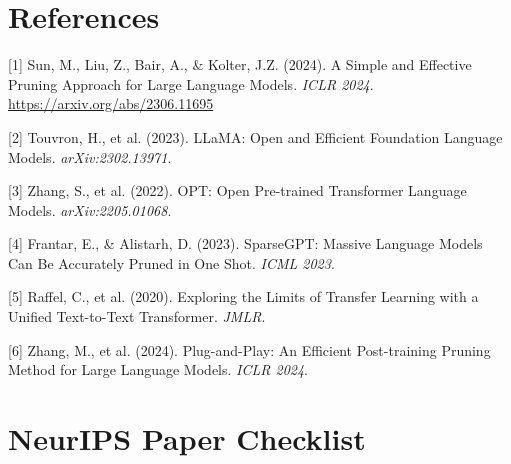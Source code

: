 \documentclass{article}
\begin{document}
\section*{References}
{
\small
[1] \label{wanda} Sun, M., Liu, Z., Bair, A., \& Kolter, J.Z. (2024).
A Simple and Effective Pruning Approach for Large Language Models.
\textit{ICLR 2024}. \url{https://arxiv.org/abs/2306.11695}

[2] \label{llama} Touvron, H., et al. (2023).
LLaMA: Open and Efficient Foundation Language Models.
\textit{arXiv:2302.13971}.

[3] \label{opt} Zhang, S., et al. (2022).
OPT: Open Pre-trained Transformer Language Models.
\textit{arXiv:2205.01068}.

[4] \label{sparsegpt} Frantar, E., \& Alistarh, D. (2023).
SparseGPT: Massive Language Models Can Be Accurately Pruned in One Shot.
\textit{ICML 2023}.

[5] \label{c4} Raffel, C., et al. (2020).
Exploring the Limits of Transfer Learning with a Unified Text-to-Text Transformer.
\textit{JMLR}.

[6] \label{ria} Zhang, M., et al. (2024).
Plug-and-Play: An Efficient Post-training Pruning Method for Large Language Models.
\textit{ICLR 2024}.
}

\newpage
\section*{NeurIPS Paper Checklist}
\end{document}
